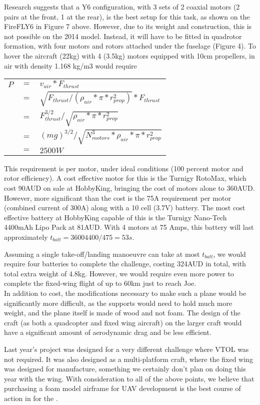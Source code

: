 \label{app:lastYear}
Research suggests that a Y6 configuration, with 3 sets of 2 coaxial motors (2 pairs at the front, 1 at the rear), is the best setup for this task, as shown on the FireFLY6 in Figure 7 above. However, due to its weight and construction, this is not possible on the 2014 model. Instead, it will have to be fitted in quadrotor formation, with four motors and rotors attached under the fuselage (Figure 4). To hover the aircraft (22kg) with 4 (3.5kg) motors equipped with 10cm propellers, in air with density 1.168 kg/m3 would require\\

\begin{tabular}{r c l}
	$P$ & $=$ & $v_{air}*F_{thrust}$\\
		& $=$ & $\sqrt{F_{thrust}/(\rho_{air}*\pi*r_{prop}^2)}*F_{thrust}$\\
		& $=$ & $F_{thrust}^{3/2}/\sqrt{\rho_{air}*\pi*r_{prop}^2}$\\
		& $=$ & $(mg)^{3/2}/\sqrt{N_{motors}^3*\rho_{air}*\pi*r_{prop}^2}$\\
		& $=$ & $2500W$\\
\end{tabular}
\vspace{6pt}

This requirement is per motor, under ideal conditions (100 percent motor and rotor efficiency). A cost effective motor for this is the Turnigy RotoMax, which cost 90AUD on sale at HobbyKing, bringing the cost of motors alone to 360AUD. However, more significant than the cost is the 75A requirement per motor (combined current of 300A) along with a 10 cell (3.7V) battery.  The most cost effective battery at HobbyKing capable of this is the Turnigy Nano-Tech 4400mAh Lipo Pack at 81AUD. \color{red} With 4 motors at 75 Amps, this battery will last approximately $t_{batt}=36004400/475=53s$. \color{black}\\

Assuming a single take-off/landing manoeuvre can take at most $t_{batt}$, we would require four batteries to complete the challenge, costing 324AUD in total, with total extra weight of 4.8kg. However, we would require even more power to complete the fixed-wing flight of up to 60km just to reach Joe.\\

In addition to cost, the modifications necessary to make such a plane would be significantly more difficult, as the supports would need to hold much more weight, and the plane itself is made of wood and not foam. \color{red} The design of the craft (as both a quadcopter and fixed wing aircraft) on the larger craft would have a significant amount of aerodynamic drag and be less efficient. \color{black}\\

Last year's project was designed for a very different challenge where VTOL was not required. It was also designed as a multi-platform craft, where the fixed wing was designed for manufacture, something we certainly don't plan on doing this year with the wing. With consideration to all of the above points, we believe that purchasing a foam model airframe for UAV development is the best course of action in for the \ID.
